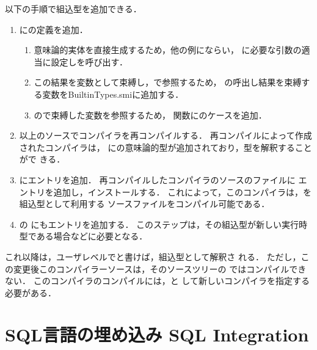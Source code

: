 \begin{enumerate}
	以下の手順で組込型を追加できる．
\begin{enumerate}
\item {}
にの定義を追加．
\begin{enumerate}
\item 意味論的実体を直接生成するため，他の例にならい，
に必要な引数の適当に設定しを呼び出す．
\item この結果を変数として束縛し，で参照するため，
の呼出し結果を束縛する変数を{BuiltinTypes.smi}に追加する．
\item {}ので束縛した変数を参照するため，
関数にのケースを追加．
\end{enumerate}
\item 以上のソースでコンパイラを再コンパイルする．
	再コンパイルによって作成されたコンパイラは，
にの意味論的型が追加されており，型を解釈することがで
きる．
\item {}にエントリを追加．
	再コンパイルしたコンパイラのソースのファイルに
エントリを追加し，インストールする．
	これによって，このコンパイラは，を組込型として利用する
ソースファイルをコンパイル可能である．
\item {}の
にもエントリを追加する．
	このステップは，その組込型が新しい実行時型である場合などに必要となる．
\end{enumerate}
	これ以降は，ユーザレベルでと書けば，組込型として解釈さ
れる．
	ただし，この変更後このコンパイラーソースは，そのソースツリーの
ではコンパイルできない．
	このコンパイラのコンパイルには，と
して新しいコンパイラを指定する必要がある．
\end{enumerate}


\chapter{\txt
{SQL言語の埋め込み}
{SQL Integration}
}
\label{chap:sqlintegration}

